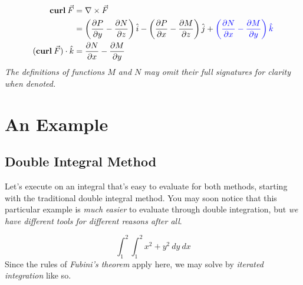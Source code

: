 \documentclass{article}
\begin{document}
\begin{equation}\label{eq:kthCurl}
\begin{aligned}
    \textbf{curl}\:\vec{F} &= \nabla\times\vec{F} \\
    &= \left(\frac{\partial P}{\partial y} - \frac{\partial N}{\partial z}\right)\hat{i} - \left(\frac{\partial P}{\partial x} - \frac{\partial M}{\partial z}\right)\hat{j} + \textcolor{blue}{\left(\frac{\partial N}{\partial x} - \frac{\partial M}{\partial y}\right)\hat{k}} \\
    (\textbf{curl}\:\vec{F})\cdot\hat{k} &= \frac{\partial N}{\partial x} - \frac{\partial M}{\partial y}
\end{aligned}
\end{equation}
\emph{The definitions of functions $M$ and $N$ may omit their full signatures for clarity when denoted.}

\section{An Example}
\subsection{Double Integral Method}

Let's execute on an integral that's easy to evaluate for both methods, starting with the traditional double integral method. You may soon notice that this particular example is \emph{much easier} to evaluate through double integration, but \emph{we have different tools for different reasons after all}.

\begin{equation}\label{eq:DoubleIntegralEx1}
    \int_1^2\int_1^2{x^2 + y^2} \:dy\:dx
\end{equation}
Since the rules of \emph{Fubini's theorem} apply here, we may solve by \emph{iterated integration} like so.
\end{document}
